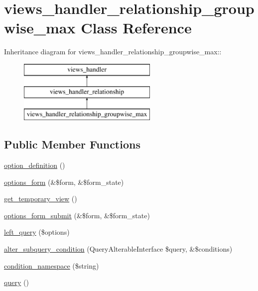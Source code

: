 \hypertarget{classviews__handler__relationship__groupwise__max}{
\section{views\_\-handler\_\-relationship\_\-groupwise\_\-max Class Reference}
\label{classviews__handler__relationship__groupwise__max}
}
Inheritance diagram for views\_\-handler\_\-relationship\_\-groupwise\_\-max::\begin{figure}[H]
\begin{center}
\leavevmode
\includegraphics[height=3cm]{classviews__handler__relationship__groupwise__max}
\end{center}
\end{figure}
\subsection*{Public Member Functions}
\begin{DoxyCompactItemize}
\item 
\hyperlink{classviews__handler__relationship__groupwise__max_a915d653a4dd09cc8968c616427a87f92}{option\_\-definition} ()
\item 
\hyperlink{classviews__handler__relationship__groupwise__max_a9cac8b627e41265e500d1a36f4d8f621}{options\_\-form} (\&\$form, \&\$form\_\-state)
\item 
\hyperlink{classviews__handler__relationship__groupwise__max_a2af65fae1b0d97331ccf817be451399c}{get\_\-temporary\_\-view} ()
\item 
\hyperlink{classviews__handler__relationship__groupwise__max_a33dd614a3c4506afe9a3746712713724}{options\_\-form\_\-submit} (\&\$form, \&\$form\_\-state)
\item 
\hyperlink{classviews__handler__relationship__groupwise__max_af16a972d2e2cccfc5d56495c9e15f42f}{left\_\-query} (\$options)
\item 
\hyperlink{classviews__handler__relationship__groupwise__max_a70411d08b3516619b376be6b3411d70c}{alter\_\-subquery\_\-condition} (QueryAlterableInterface \$query, \&\$conditions)
\item 
\hyperlink{classviews__handler__relationship__groupwise__max_af6f3f64602d39ea3f4620f06534c5779}{condition\_\-namespace} (\$string)
\item 
\hyperlink{classviews__handler__relationship__groupwise__max_a26fd71d0c45deea3dcd04e40fe58df7c}{query} ()
\end{DoxyCompactItemize}


